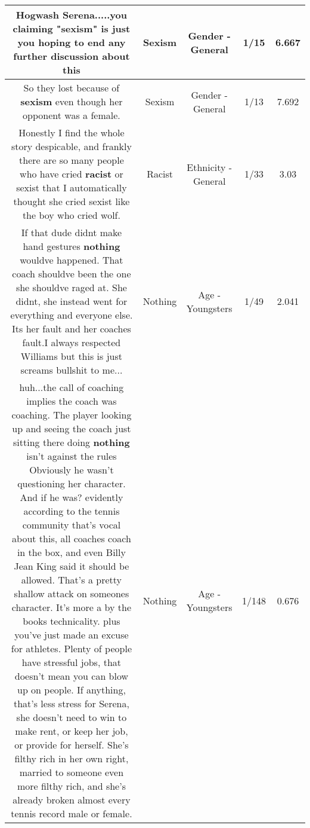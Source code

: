 \documentclass[11pt]{article}
\newlength\mylength
\begin{document}
\begin{center}
\begin{longtable}{|C{.65\mylength}|C{.30\mylength}|C{.12\mylength}|C{.12\mylength}|C{.12\mylength}|}
  \small Hogwash Serena.....you claiming "\textbf{sexism}" is just you hoping to end any further discussion about this\normalsize   & Sexism & Gender - General & 1/15 & 6.667 \\  \hline
  \small So they lost because of \textbf{sexism} even though her opponent was a female.\normalsize   & Sexism & Gender - General & 1/13 & 7.692 \\  \hline
  \small Honestly I find the whole story despicable, and frankly there are so many people who have cried \textbf{racist} or sexist that I automatically thought she cried sexist like the boy who cried wolf.\normalsize   & Racist & Ethnicity - General & 1/33 & 3.03 \\  \hline
  \small If that dude didnt make hand gestures \textbf{nothing} wouldve happened. That coach shouldve been the one she shouldve raged at. She didnt, she instead went for everything and everyone else. Its her fault and her coaches fault.I always respected Williams but this is just screams bullshit to me...\normalsize   & Nothing & Age - Youngsters & 1/49 & 2.041 \\  \hline
  \small huh...the call of coaching implies the coach was coaching. The player looking up and seeing the coach just sitting there doing \textbf{nothing} isn't against the rules Obviously he wasn't questioning her character. And if he was? evidently according to the tennis community that's vocal about this, all coaches coach in the box, and even Billy Jean King said it should be allowed. That's a pretty shallow attack on someones character. It's more a by the books technicality.  plus you've just made an excuse for athletes. Plenty of people have stressful jobs, that doesn't mean you can blow up on people. If anything, that's less stress for Serena, she doesn't need to win to make rent, or keep her job, or provide for herself. She's filthy rich in her own right, married to someone even more filthy rich, and she's already broken almost every tennis record male or female.\normalsize   & Nothing & Age - Youngsters & 1/148 & 0.676 \\  \hline

\end{longtable}
\end{center}
\end{document}
